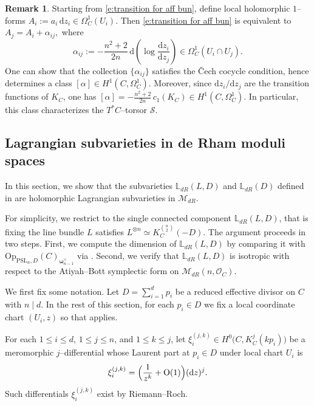\documentclass[twoside, 11pt]{article}
\numberwithin{equation}{section}
\theoremstyle{theorem}
\numberwithin{theorem}{section}
\theoremstyle{definition}
\newtheorem{remark}[remark]{Remark}
\begin{document}
\begin{remark}\label{r:torsor class}
Starting from \eqref{e:transition for aff bun}, define local holomorphic $1$--forms
\(
A_i:=a_i\,\mathrm d z_i \in \Omega_C^1(U_i).
\)
Then \eqref{e:transition for aff bun} is equivalent to
\(
A_j = A_i + \alpha_{ij},
\)
where
\begin{equation}\label{eq:alphaij}
\alpha_{ij}:= - \frac{n^2+2}{2n}\, \mathrm d\!\left(\log\frac{\mathrm d z_i}{\mathrm d z_j}\right) \in \Omega_C^1(U_i\cap U_j).
\end{equation}
One can show that the collection $\{\alpha_{ij}\}$ satisfies the \v{C}ech cocycle condition, hence determines a class
\(
[\alpha]\in H^1(C,\Omega_C^1).
\)
Moreover, since ${\mathrm d z_i}/{\mathrm d z_j}$ are the transition functions of $K_C$, one has
\(
[\alpha]=-\frac{n^2+2}{2n}\,c_1(K_C)\in H^1(C,\Omega_C^1).
\)
In particular, this class characterizes the $T^\ast C$--torsor $\mathcal{S}$.
\end{remark}

\subsection{Lagrangian subvarieties in de Rham moduli spaces}
In this section, we show that the subvarieties $\mathbb L_{dR}(L,D)$ and $\mathbb L_{dR}(D)$ defined in  are holomorphic Lagrangian subvarieties in $\mathcal M_{dR}$.

For simplicity, we restrict to the  single connected component $\mathbb L_{dR}(L,D)$, that is fixing the line bundle $L$ satisfies
\(
L^{\otimes n}\simeq K_C^{\binom{n}{2}}(-D).
\)
The argument proceeds in two steps. First, we compute the dimension of $\mathbb L_{dR}(L,D)$ by comparing it with
$\mathrm{Op}_{\mathrm{PSL}_n,D}(C)_{\boldsymbol{\omega}_{n-1}^{\vee}}$ via . Second, we verify that $\mathbb L_{dR}(L,D)$ is isotropic with respect to the Atiyah--Bott symplectic form on $\mathcal{M}_{dR}(n, \mathcal{O}_C)$.

We first fix some notation. Let \( D=\sum_{i=1}^d p_i \) be a reduced effective divisor on $C$ with $n\mid d$.
In the rest of this section, for each \(p_i\in D\) we fix a local coordinate chart \((U_i,z)\) so that  applies.

For each $1\le i\le d$, $1 \le j \le n$, and $1\le k\le j$, let
\(
\xi_i^{(j,k)}\in H^0 \bigl(C,K_C^{j}(k p_i)\bigr)
\)
be a meromorphic $j$--differential whose Laurent part at $p_i\in D$ under local chart $U_i$ is
\[
\xi_i^{(j,k)}=\Bigl(\frac{1}{z^{k}}+\mathrm O(1)\Bigr)(\mathrm d z)^{j}.
\]
Such differentials $\xi_i^{(j,k)}$ exist by Riemann--Roch.
\end{document}
